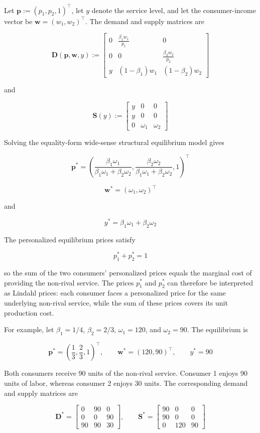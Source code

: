 \documentclass[
  letterpaper,
  DIV=11,
  numbers=noendperiod]{scrreprt}
\begin{document}
Let \(\mathbf p:=(p_1,p_2,1)^\top\), let \(y\) denote the service level,
and let the consumer-income vector be \(\mathbf w=(w_1,w_2)^\top\). The
demand and supply matrices are

\[
\mathbf D(\mathbf p,\mathbf w,y)
:=
\begin{bmatrix}
0 & \frac{\beta_1w_1}{p_1} & 0\\
0 & 0 & \frac{\beta_2w_2}{p_2}\\
y & (1-\beta_1)w_1 & (1-\beta_2)w_2
\end{bmatrix}
\]

and

\[
\mathbf S(y)
:=
\begin{bmatrix}
y & 0 & 0\\
y & 0 & 0\\
0 & \omega_1 & \omega_2
\end{bmatrix}
\]

Solving the equality-form wide-sense structural equilibrium model gives

\[
\mathbf p^*
=
\left(
\frac{\beta_1\omega_1}
{\beta_1\omega_1+\beta_2\omega_2},
\frac{\beta_2\omega_2}
{\beta_1\omega_1+\beta_2\omega_2},
1
\right)^\top
\]

\[
\mathbf w^*
=
(\omega_1,\omega_2)^\top
\]

and

\[
y^*
=
\beta_1\omega_1+\beta_2\omega_2
\]

The personalized equilibrium prices satisfy

\[
p_1^*+p_2^*=1
\]

so the sum of the two consumers' personalized prices equals the marginal
cost of providing the non-rival service. The prices \(p_1^*\) and
\(p_2^*\) can therefore be interpreted as Lindahl prices: each consumer
faces a personalized price for the same underlying non-rival service,
while the sum of these prices covers its unit production cost.

For example, let \(\beta_1=1/4\), \(\beta_2=2/3\), \(\omega_1=120\), and
\(\omega_2=90\). The equilibrium is

\[
\mathbf p^*
=
\left(
\frac13,\frac23,1
\right)^\top,
\qquad
\mathbf w^*
=
(120,90)^\top,
\qquad
y^*=90
\]

Both consumers receive 90 units of the non-rival service. Consumer 1
enjoys 90 units of labor, whereas consumer 2 enjoys 30 units. The
corresponding demand and supply matrices are

\[
\mathbf D^*
=
\begin{bmatrix}
0&90&0\\
0&0&90\\
90&90&30
\end{bmatrix},
\qquad
\mathbf S^*
=
\begin{bmatrix}
90&0&0\\
90&0&0\\
0&120&90
\end{bmatrix}
\]
\end{document}
